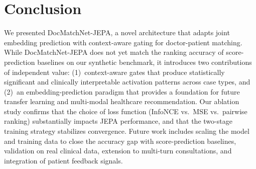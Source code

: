 \documentclass[journal]{IEEEtran}
\begin{document}
\section{Conclusion}

We presented DocMatchNet-JEPA, a novel architecture that adapts
joint embedding prediction with context-aware gating for
doctor-patient matching. While DocMatchNet-JEPA does not yet
match the ranking accuracy of score-prediction baselines on our
synthetic benchmark, it introduces two contributions of
independent value: (1)~context-aware gates that produce
statistically significant and clinically interpretable activation
patterns across case types, and (2)~an embedding-prediction
paradigm that provides a foundation for future transfer learning
and multi-modal healthcare recommendation. Our ablation study
confirms that the choice of loss function (InfoNCE vs.\ MSE vs.\
pairwise ranking) substantially impacts JEPA performance, and
that the two-stage training strategy stabilizes convergence.
Future work includes scaling the model and training data to close
the accuracy gap with score-prediction baselines, validation on
real clinical data, extension to multi-turn consultations, and
integration of patient feedback signals.



\end{document}
